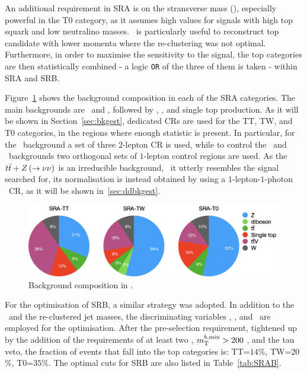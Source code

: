 				An additional requirement in SRA is on the stransverse mass (\mttwo), especially powerful in the T0 category, as it assumes high values for signals with high top squark and low neutralino masses. \mttwo\ is particularly useful to reconstruct top candidate with lower momenta where the re-clustering was not optimal. Furthermore, in order to maximise the sensitivity to the signal, the top categories are then statistically combined - a logic \verb+OR+ of the three of them is taken - within SRA and SRB.

				Figure~\ref{fig:SRA_bkgcomp} shows the background composition in each of the SRA categories. The main backgrounds are \Zjets\ and \ttV, followed by \ttbar, \Wjets, and single top production. As it will be shown in Section~\ref{sec:bkgest}, dedicated \acp{CR} are used for the TT, TW, and T0 categories, in the regions where enough statistic is present. In particular, for the \Zjets\ background a set of three $2$-lepton \ac{CR} is used, while to control the \ttbar\ and \Wjets\ backgrounds two orthogonal sets of $1$-lepton control regions are used. As the $t\bar{t}+Z \left ( \rightarrow \nu\nu\right)$ is an irreducible background, \ie\ it utterly resembles the signal searched for, its normalisation is instead obtained by using a $1$-lepton-$1$-photon \ttgamma\ \ac{CR}, as it will be shown in~\ref{sec:ddbkgest}.

				\begin{figure}[t]
				  \begin{center}
				   \includegraphics[width=\textwidth]{figures/stop/piechart_SRAcomp}
				   \caption{Background composition in \SRA.}
				   \label{fig:SRA_bkgcomp}
				  \end{center}
				\end{figure}

				For the optimisation of SRB, a similar strategy was adopted. In addition to the \met\ and the re-clustered jet masses, the discriminating variables \mtbmin, \mtbmax, and \drbb\ are employed for the optimisation. After the pre-selection requirement, tightened up by the addition of the requirements of at least two \bjs, $m_{\mathrm{T}}^{b,\mathrm{min}} > 200$ \gev, and the tau veto, the fraction of events that fall into the top categories is: TT=$14\%$, TW=20$\%$, T0=$35\%$. The optimal cuts for SRB are also listed in Table~\ref{tab:SRAB}. 

